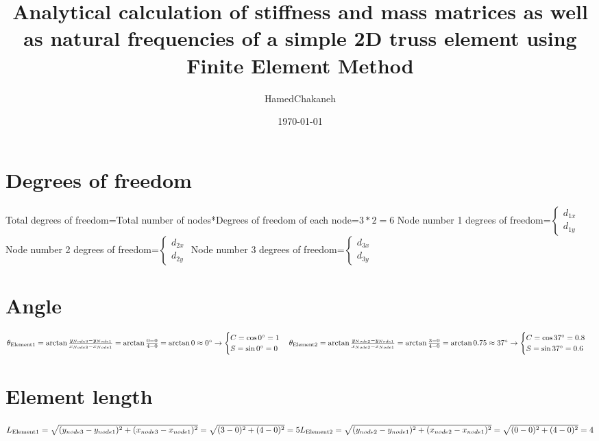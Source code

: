 \documentclass{article}
\title {Analytical calculation of stiffness and mass matrices as well as natural frequencies of a simple 2D truss element using Finite Element Method}
\author{HamedChakaneh}
\date{\today}
\begin{document}
\maketitle
\section{Degrees of freedom}
Total degrees of freedom=Total number of nodes*Degrees of freedom of each node=$3*2=6$
\newline Node number 1 degrees of freedom=$\begin{cases}d_{1x}\\d_{1y}\end{cases}$
\newline Node number 2 degrees of freedom=$\begin{cases}d_{2x}\\d_{2y}\end{cases}$
\newline Node number 3 degrees of freedom=$\begin{cases}d_{3x}\\d_{3y}\end{cases}$
\section{Angle}
    \begin{math}
    \theta_{\text{Element1}}=\arctan\frac{y_{Node3}-y_{Node1}}{x_{Node3}-   x_{Node1}}=\arctan\frac{0-0}{4-0}=\arctan0\approx0^{\circ}\rightarrow
        \begin{cases}
        C=\cos0^{\circ}=1\\
        S=\sin0^{\circ}=0
        \end{cases}
    \newline
    \theta_{\text{Element2}}=\arctan\frac{y_{Node2}-y_{Node1}}{x_{Node2}-x_{Node1}}=\arctan\frac{3-0}{4-0}=\arctan0.75\approx37^{\circ}\rightarrow
        \begin{cases}
        C=\cos37^{\circ}=0.8\\
        S=\sin37^{\circ}=0.6
        \end{cases}
    \end{math}
\section{Element length}
    \begin{math}
    L_{\text{Element1}}=\sqrt{(y_{node3}-y_{node1})^2+(x_{node3}-x_{node1})^2}=\sqrt{(3-0)^2+(4-0)^2}=5
    \newline
    L_{\text{Element2}}=\sqrt{(y_{node2}-y_{node1})^2+(x_{node2}-x_{node1})^2}=\sqrt{(0-0)^2+(4-0)^2}=4
    \end{math}
\end{document}
